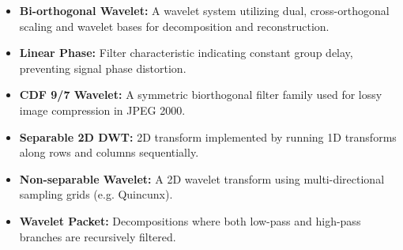 \documentclass[12pt,a4paper]{article}
\begin{document}
\begin{tcolorbox}[defbox, title={\textbf{One-Line Definitions}}]
\begin{itemize}[leftmargin=*, itemsep=3.5pt]
  \item \textbf{Bi-orthogonal Wavelet:} A wavelet system utilizing dual, cross-orthogonal scaling and wavelet bases for decomposition and reconstruction.
  \item \textbf{Linear Phase:} Filter characteristic indicating constant group delay, preventing signal phase distortion.
  \item \textbf{CDF 9/7 Wavelet:} A symmetric biorthogonal filter family used for lossy image compression in JPEG 2000.
  \item \textbf{Separable 2D DWT:} 2D transform implemented by running 1D transforms along rows and columns sequentially.
  \item \textbf{Non-separable Wavelet:} A 2D wavelet transform using multi-directional sampling grids (e.g. Quincunx).
  \item \textbf{Wavelet Packet:} Decompositions where both low-pass and high-pass branches are recursively filtered.
\end{itemize}
\end{tcolorbox}
\end{document}
